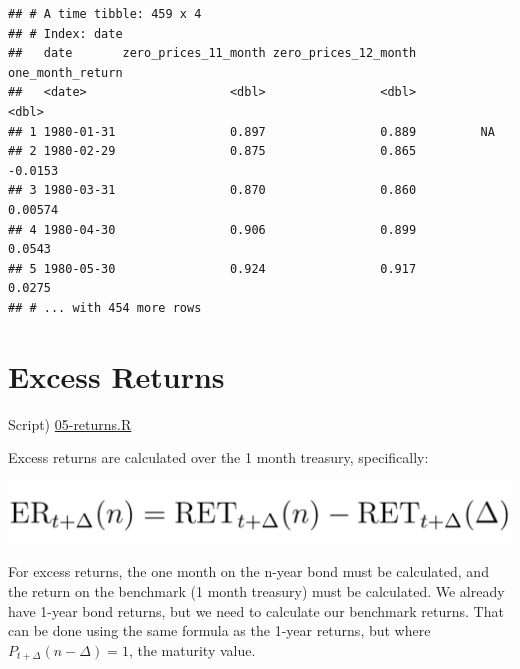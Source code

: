 \documentclass[]{book}
\newenvironment{Shaded}{\begin{snugshade}}{\end{snugshade}}
\newcommand{\DataTypeTok}[1]{\textcolor[rgb]{0.13,0.29,0.53}{#1}}
\newcommand{\DecValTok}[1]{\textcolor[rgb]{0.00,0.00,0.81}{#1}}
\newcommand{\KeywordTok}[1]{\textcolor[rgb]{0.13,0.29,0.53}{\textbf{#1}}}
\newcommand{\NormalTok}[1]{#1}
\newcommand{\OperatorTok}[1]{\textcolor[rgb]{0.81,0.36,0.00}{\textbf{#1}}}
\newcommand{\StringTok}[1]{\textcolor[rgb]{0.31,0.60,0.02}{#1}}
\theoremstyle{definition}
\theoremstyle{definition}
\theoremstyle{definition}
\theoremstyle{remark}
\begin{document}
\begin{verbatim}
## # A time tibble: 459 x 4
## # Index: date
##   date       zero_prices_11_month zero_prices_12_month one_month_return
##   <date>                    <dbl>                <dbl>            <dbl>
## 1 1980-01-31                0.897                0.889         NA      
## 2 1980-02-29                0.875                0.865         -0.0153 
## 3 1980-03-31                0.870                0.860          0.00574
## 4 1980-04-30                0.906                0.899          0.0543 
## 5 1980-05-30                0.924                0.917          0.0275 
## # ... with 454 more rows
\end{verbatim}

\hypertarget{excess-returns}{%
\section{Excess Returns}\label{excess-returns}}

Script) \href{./R/05-returns.R}{05-returns.R}

Excess returns are calculated over the 1 month treasury, specifically:

\begin{center}\includegraphics[width=14.89in]{images/excess-returns} \end{center}

For excess returns, the one month on the n-year bond must be calculated,
and the return on the benchmark (1 month treasury) must be calculated.
We already have 1-year bond returns, but we need to calculate our
benchmark returns. That can be done using the same formula as the 1-year
returns, but where \(P_{t+\Delta}(n-\Delta) = 1\), the maturity value.

\begin{Shaded}
\end{Shaded}
\end{document}
